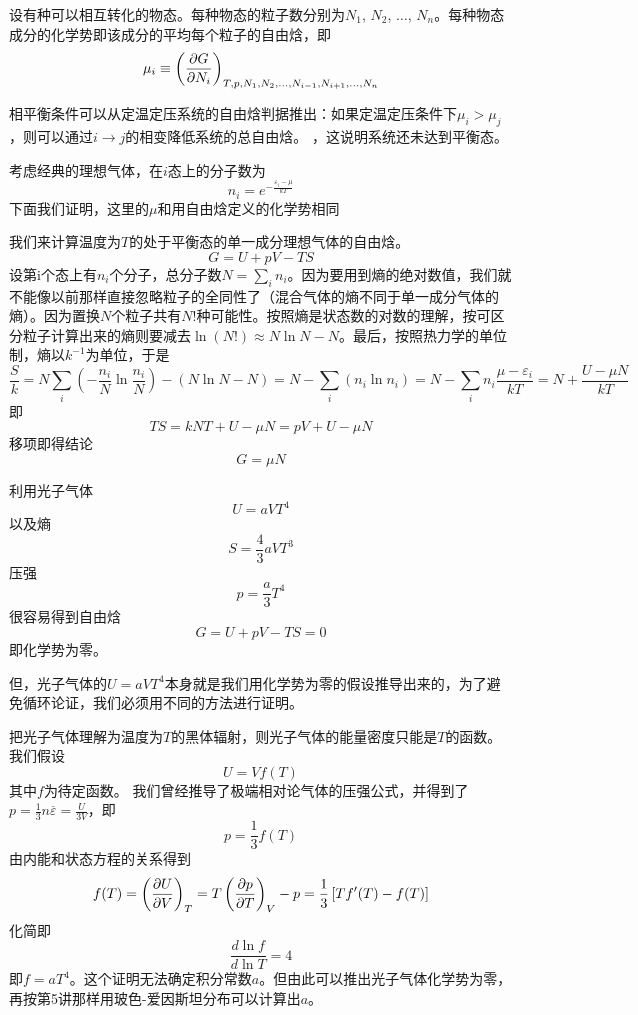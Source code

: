 \documentclass[CJK]{beamer}
\begin{document}
\begin{frame}
\bch
设有种可以相互转化的物态。每种物态的粒子数分别为$N_1$, $N_2$, $\ldots$, $N_n$。每种物态成分的化学势即该成分的平均每个粒子的自由焓，即
$$ \mu_i \equiv \left(\frac{\partial G}{\partial N_i}\right)_{T,p,N_1, N_2, \ldots, N_{i-1}, N_{i+1}, \ldots, N_n} $$


相平衡条件可以从定温定压系统的自由焓判据推出：如果定温定压条件下$ \mu_i > \mu_j$，则可以通过$i\rightarrow j$的相变降低系统的总自由焓。
，这说明系统还未达到平衡态。
\ech
\end{frame}


\begin{frame}
\bch
{\small
考虑经典的理想气体，在$i$态上的分子数为
$$ n_i = e^{-\frac{\varepsilon_i-\mu}{kT}}$$
下面我们证明，这里的$\mu$和用自由焓定义的化学势相同}

{\scriptsize
  我们来计算温度为$T$的处于平衡态的单一成分理想气体的自由焓。
  $$G = U + pV - TS$$
  设第i个态上有$n_i$个分子，总分子数$N=\sum_i n_i$。因为要用到熵的绝对数值，我们就不能像以前那样直接忽略粒子的全同性了（混合气体的熵不同于单一成分气体的熵）。因为置换$N$个粒子共有$N!$种可能性。按照熵是状态数的对数的理解，按可区分粒子计算出来的熵则要减去$\ln (N!) \approx N \ln N - N $。最后，按照热力学的单位制，熵以$k^{-1}$为单位，于是
  $$\frac{S}{k} = N\sum_i\left(-\frac{n_i}{N}\ln\frac{n_i}{N}\right)  - (N\ln N - N) = N-\sum_i (n_i\ln n_i) = N - \sum_in_i\frac{\mu - \varepsilon_i}{kT} =N+\frac{U-\mu N}{kT}  $$
  即
  $$TS = kNT + U - \mu N = pV + U - \mu N$$
  移项即得结论$$ G = \mu N$$
}
\ech
\end{frame}

\begin{frame}
\bch
利用光子气体
$$U = aV T^4$$
以及熵
$$ S = \frac{4}{3}aV T^3$$
压强
$$ p = \frac{a}{3} T^4$$
很容易得到自由焓
$$ G = U + pV - TS = 0$$
即化学势为零。

但，光子气体的$U = aVT^4$本身就是我们用化学势为零的假设推导出来的，为了避免循环论证，我们必须用不同的方法进行证明。
\ech
\end{frame}


\begin{frame}
\bch
{\small
把光子气体理解为温度为$T$的黑体辐射，则光子气体的能量密度只能是$T$的函数。我们假设
$$ U = V f(T)$$
其中$f$为待定函数。
我们曾经推导了极端相对论气体的压强公式，并得到了$p = \frac{1}{3} n\overline{\varepsilon} = \frac{U}{3V} $，即
$$p = \frac{1}{3} f(T)$$
由内能和状态方程的关系得到
$$ f(T) = \left(\frac{\partial U}{\partial V}\right)_{T} = T\left(\frac{\partial p}{\partial T}\right)_{V} - p = \frac{1}{3} \left[T f'(T) - f(T)\right]$$
化简即
$$ \frac{d \ln f}{d\ln T}  = 4 $$
即$ f = a T^4 $。这个证明无法确定积分常数$a$。但由此可以推出光子气体化学势为零，再按第5讲那样用玻色-爱因斯坦分布可以计算出$a$。
}
\ech
\end{frame}
\end{document}
